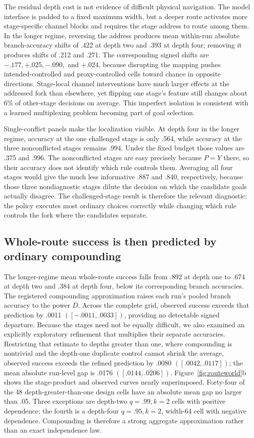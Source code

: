 \documentclass[11pt,a4paper]{article}
\begin{document}
The residual depth cost is not evidence of difficult physical navigation. The model interface is padded to a fixed maximum width, but a deeper route activates more stage-specific channel blocks and requires the stage address to route among them. In the longer regime, reversing the address produces mean within-run absolute branch-accuracy shifts of .422 at depth two and .393 at depth four; removing it produces shifts of .212 and .271. The corresponding signed shifts are $-.177,+.025,-.090,$ and $+.024$, because disrupting the mapping pushes intended-controlled and proxy-controlled cells toward chance in opposite directions. Stage-local channel interventions have much larger effects at the addressed fork than elsewhere, yet flipping one stage's feature still changes about 6\% of other-stage decisions on average. This imperfect isolation is consistent with a learned multiplexing problem becoming part of goal selection.

Single-conflict panels make the localization visible. At depth four in the longer regime, accuracy at the one challenged stage is only .564, while accuracy at the three nonconflicted stages remains .994. Under the fixed budget those values are .375 and .996. The nonconflicted stages are easy precisely because $P=Y$ there, so their accuracy does not identify which rule controls them. Averaging all four stages would give the much less informative .887 and .840, respectively, because those three nondiagnostic stages dilute the decision on which the candidate goals actually disagree. The challenged-stage result is therefore the relevant diagnostic: the policy executes most ordinary choices correctly while changing which rule controls the fork where the candidates separate.

\subsection*{Whole-route success is then predicted by ordinary compounding}

The longer-regime mean whole-route success falls from .892 at depth one to .674 at depth two and .384 at depth four, below its corresponding branch accuracies. The registered compounding approximation raises each run's pooled branch accuracy to the power $D$. Across the complete grid, observed success exceeds that prediction by .0011 $([-.0011,.0033])$, providing no detectable signed departure. Because the stages need not be equally difficult, we also examined an explicitly exploratory refinement that multiplies their separate accuracies. Restricting that estimate to depths greater than one, where compounding is nontrivial and the depth-one duplicate control cannot shrink the average, observed success exceeds the refined prediction by .0080 $([.0042,.0117])$; the mean absolute run-level gap is .0176 $([.0144,.0206])$. Figure~\ref{fig:routeworld}b shows the stage-product and observed curves nearly superimposed. Forty-four of the 48 depth-greater-than-one design cells have an absolute mean gap no larger than .05. Three exceptions are depth-two $q=.99,k=2$ cells with positive dependence; the fourth is a depth-four $q=.95,k=2$, width-64 cell with negative dependence. Compounding is therefore a strong aggregate approximation rather than an exact independence law.
\end{document}
